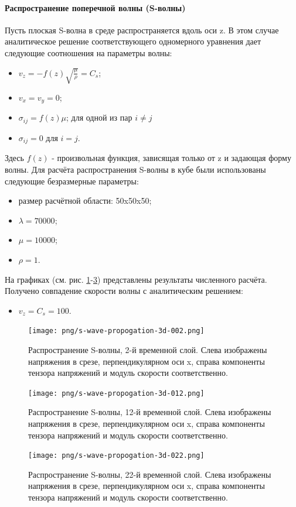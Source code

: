 \paragraph{Распространение поперечной волны (S-волны)}
Пусть плоская S-волна в среде распространяется вдоль оси z. В этом случае аналитическое решение соответствующего одномерного уравнения дает следующие соотношения на параметры волны:
\begin{itemize}
\item $v_z=-f(z)\sqrt{\frac{\mu}{\rho}}=C_s$;
\item $v_x=v_y=0$;
\item $\sigma_{ij}=f(z)\mu$; для одной из пар $i \neq j$
\item $\sigma_{ij}=0$ для $i = j$.
\end{itemize}
Здесь $f(z)$ - произвольная функция, зависящая только от z и задающая форму волны.
Для расчёта распространения S-волны в кубе были использованы следующие безразмерные параметры: 
\begin{itemize}
\item размер расчётной области: 50x50x50;
\item $\lambda=70000$;
\item $\mu=10000$;
\item $\rho=1$.
\end{itemize}
На графиках (см. рис.
\ref{pic:s_wave_2}-\ref{pic:s_wave_22}) представлены результаты численного расчёта. Получено совпадение скорости волны с аналитическим решением:
\begin{itemize}
\item $v_z=C_s=100$.
\end{itemize}
\begin{figure}[htp]
\centering
\texttt{[image: png/s-wave-propogation-3d-002.png]}
\caption{Распространение S-волны, 2-й временной слой. Слева изображены
напряжения в срезе, перпендикулярном оси x, справа компоненты тензора напряжений
и модуль скорости соответственно.}
\label{pic:s_wave_2}
\end{figure}
\begin{figure}[htp]
\centering
\texttt{[image: png/s-wave-propogation-3d-012.png]}
\caption{Распространение S-волны, 12-й временной слой. Слева изображены
напряжения в срезе, перпендикулярном оси x, справа компоненты тензора напряжений
и модуль скорости соответственно.}
\label{pic:s_wave_12}
\end{figure}
\begin{figure}[htp]
\centering
\texttt{[image: png/s-wave-propogation-3d-022.png]}
\caption{Распространение S-волны, 22-й временной слой. Слева изображены
напряжения в срезе, перпендикулярном оси x, справа компоненты тензора напряжений
и модуль скорости соответственно.}
\label{pic:s_wave_22}
\end{figure}


